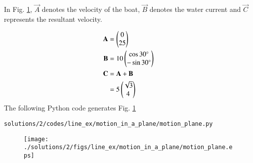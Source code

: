 In Fig. \ref{fig:3.8.2_motion_plane_motion_in_a_plane},  $\vec{A}$ denotes the velocity of the boat, $
\vec{B}$ denotes the water current and $\vec{C}$ represents the resultant velocity. 

 \begin{align}
\mathbf{A} &=\begin{pmatrix}0\\25\end{pmatrix} \label{eq:constr_a_motion_in_a_plane}\\
\mathbf{B} &=10\begin{pmatrix}\cos 30\degree\\ -\sin 30\degree\end{pmatrix} \label{eq:constr_b_motion_in_a_plane}\\
\mathbf{C} &= \mathbf{A} + \mathbf{B}\\
&=5\begin{pmatrix}\sqrt{3} \\4\end{pmatrix}
\end{align}
The following Python code generates Fig. \ref{fig:3.8.2_motion_plane_motion_in_a_plane}

\begin{lstlisting}
solutions/2/codes/line_ex/motion_in_a_plane/motion_plane.py
\end{lstlisting}

 \begin{figure}[!ht]
\centering
\texttt{[image: ./solutions/2/figs/line\_ex/motion\_in\_a\_plane/motion\_plane.eps]}
\caption{}
\label{fig:3.8.2_motion_plane_motion_in_a_plane}
\end{figure} 


